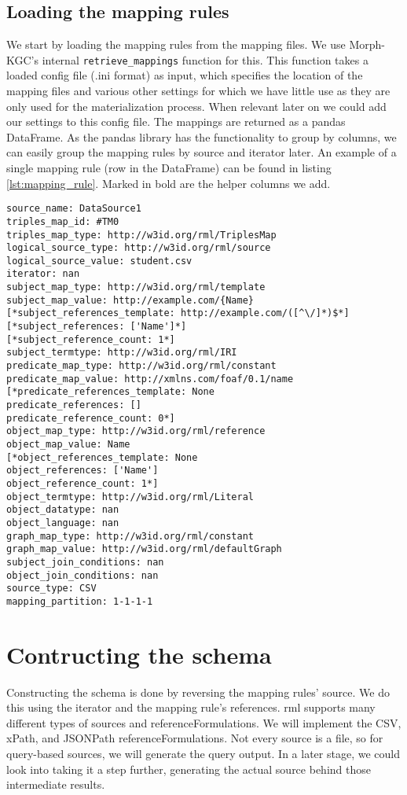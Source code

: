 \subsection{Loading the mapping rules}
We start by loading the mapping rules from the mapping files. We use Morph-KGC's internal \texttt{retrieve\_mappings} function for this. This function takes a loaded config file (.ini format) as input, which specifies the location of the mapping files and various other settings for which we have little use as they are only used for the materialization process. When relevant later on we could add our settings to this config file.
The mappings are returned as a pandas DataFrame. As the pandas library has the functionality to group by columns, we can easily group the mapping rules by source and iterator later. An example of a single mapping rule (row in the DataFrame) can be found in listing \ref{lst:mapping_rule}. Marked in bold are the helper columns we add.

\begin{lstlisting}[caption={Example of a mapping rule in Morph-KGC}, label={lst:mapping_rule}, captionpos=b, basicstyle=\small]
source_name: DataSource1
triples_map_id: #TM0
triples_map_type: http://w3id.org/rml/TriplesMap
logical_source_type: http://w3id.org/rml/source
logical_source_value: student.csv
iterator: nan
subject_map_type: http://w3id.org/rml/template
subject_map_value: http://example.com/{Name}
[*subject_references_template: http://example.com/([^\/]*)$*]
[*subject_references: ['Name']*]
[*subject_reference_count: 1*]
subject_termtype: http://w3id.org/rml/IRI
predicate_map_type: http://w3id.org/rml/constant
predicate_map_value: http://xmlns.com/foaf/0.1/name
[*predicate_references_template: None
predicate_references: []
predicate_reference_count: 0*]
object_map_type: http://w3id.org/rml/reference
object_map_value: Name
[*object_references_template: None
object_references: ['Name']
object_reference_count: 1*]
object_termtype: http://w3id.org/rml/Literal
object_datatype: nan
object_language: nan
graph_map_type: http://w3id.org/rml/constant
graph_map_value: http://w3id.org/rml/defaultGraph
subject_join_conditions: nan
object_join_conditions: nan
source_type: CSV
mapping_partition: 1-1-1-1
\end{lstlisting}

\section{Contructing the schema}
\label{section:constructing_schema}
Constructing the schema is done by reversing the mapping rules' source. We do this using the iterator and the mapping rule's references. \acrshort{rml} supports many different types of sources and referenceFormulations. We will implement the CSV, xPath, and JSONPath referenceFormulations. Not every source is a file, so for query-based sources, we will generate the query output. In a later stage, we could look into taking it a step further, generating the actual source behind those intermediate results.

